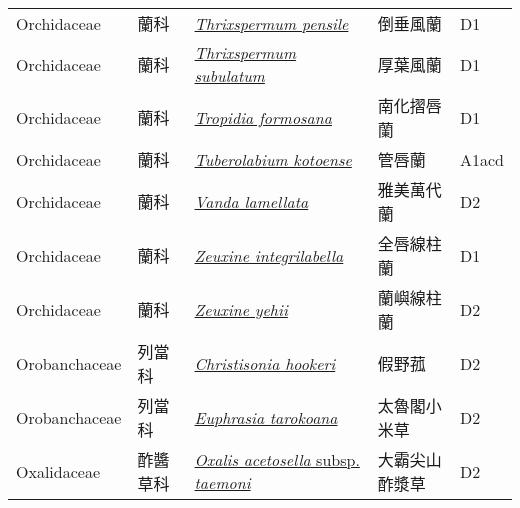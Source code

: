 {\begin{longtable}{p{2.5cm}p{2cm}p{5cm}p{2.5cm}p{3cm}}
    Orchidaceae & 蘭科 & \href{http://www.theplantlist.org/tpl1.1/search?q=Thrixspermum+pensile}{\textit{Thrixspermum pensile} } & 倒垂風蘭 & D1 \index{Thrixspermum@\textit{Thrixspermum}!pensile@\textit{pensile}}  \index{倒垂風蘭} \\
    Orchidaceae & 蘭科 & \href{http://www.theplantlist.org/tpl1.1/search?q=Thrixspermum+subulatum}{\textit{Thrixspermum subulatum} } & 厚葉風蘭 & D1 \index{Thrixspermum@\textit{Thrixspermum}!subulatum@\textit{subulatum}}  \index{厚葉風蘭} \\
    Orchidaceae & 蘭科 & \href{http://www.theplantlist.org/tpl1.1/search?q=Tropidia+formosana}{\textit{Tropidia formosana} } & 南化摺唇蘭 & D1 \index{Tropidia@\textit{Tropidia}!formosana@\textit{formosana}}  \index{南化摺唇蘭} \\
    Orchidaceae & 蘭科 & \href{http://www.theplantlist.org/tpl1.1/search?q=Tuberolabium+kotoense}{\textit{Tuberolabium kotoense} } & 管唇蘭 & A1acd \index{Tuberolabium@\textit{Tuberolabium}!kotoense@\textit{kotoense}}  \index{管唇蘭} \\
    Orchidaceae & 蘭科 & \href{http://www.theplantlist.org/tpl1.1/search?q=Vanda+lamellata}{\textit{Vanda lamellata} } & 雅美萬代蘭 & D2 \index{Vanda@\textit{Vanda}!lamellata@\textit{lamellata}}  \index{雅美萬代蘭} \\
    Orchidaceae & 蘭科 & \href{http://www.theplantlist.org/tpl1.1/search?q=Zeuxine+integrilabella}{\textit{Zeuxine integrilabella} } & 全唇線柱蘭 & D1 \index{Zeuxine@\textit{Zeuxine}!integrilabella@\textit{integrilabella}}  \index{全唇線柱蘭} \\
    Orchidaceae & 蘭科 & \href{http://www.theplantlist.org/tpl1.1/search?q=Zeuxine+yehii}{\textit{Zeuxine yehii} } & 蘭嶼線柱蘭 & D2 \index{Zeuxine@\textit{Zeuxine}!yehii@\textit{yehii}}  \index{蘭嶼線柱蘭} \\
    Orobanchaceae & 列當科 & \href{http://www.theplantlist.org/tpl1.1/search?q=Christisonia+hookeri}{\textit{Christisonia hookeri} } & 假野菰 & D2 \index{Christisonia@\textit{Christisonia}!hookeri@\textit{hookeri}}  \index{假野菰} \\
    Orobanchaceae & 列當科 & \href{http://www.theplantlist.org/tpl1.1/search?q=Euphrasia+tarokoana}{\textit{Euphrasia tarokoana} } & 太魯閣小米草 & D2 \index{Euphrasia@\textit{Euphrasia}!tarokoana@\textit{tarokoana}}  \index{太魯閣小米草} \\
    Oxalidaceae & 酢醬草科 & \href{http://www.theplantlist.org/tpl1.1/search?q=Oxalis+acetosella+subsp.+taemoni}{\textit{Oxalis acetosella} subsp. \textit{taemoni} } & 大霸尖山酢漿草 & D2 \index{Oxalis@\textit{Oxalis}!acetosella@\textit{acetosella}!subsp. taemoni@subsp. \textit{taemoni}}  \index{大霸尖山酢漿草} \\

\end{longtable}}
